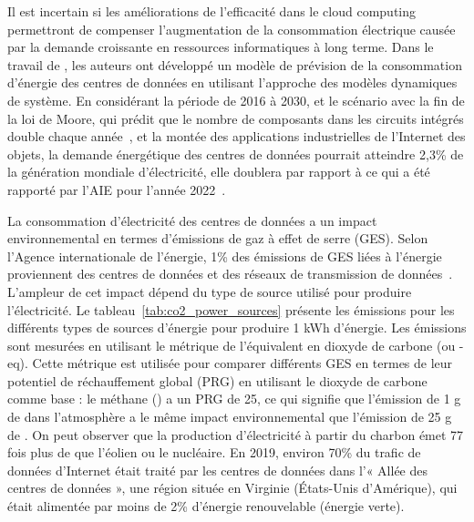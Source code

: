 Il est incertain si les améliorations de l'efficacité dans le cloud computing permettront de compenser l'augmentation de la consommation électrique causée par la demande croissante en ressources informatiques à long terme. Dans le travail de \citet{koot2021usage}, les auteurs ont développé un modèle de prévision de la consommation d'énergie des centres de données en utilisant l'approche des modèles dynamiques de système. En considérant la période de 2016 à 2030, et le scénario avec la fin de la loi de Moore, qui prédit que le nombre de composants dans les circuits intégrés double chaque année~\cite{Mack_2011_moorelaw}, et la montée des applications industrielles de l'Internet des objets, la demande énergétique des centres de données pourrait atteindre 2,3\% de la génération mondiale d'électricité, elle doublera par rapport à ce qui a été rapporté par l'AIE pour l'année 2022~\cite{IEA_2022}.


La consommation d'électricité des centres de données a un impact environnemental en termes d'émissions de gaz à effet de serre (GES). Selon l'Agence internationale de l'énergie, 1\% des émissions de GES liées à l'énergie proviennent des centres de données et des réseaux de transmission de données~\cite{IEA_2022}. L'ampleur de cet impact dépend du type de source utilisé pour produire l'électricité. Le tableau~\ref{tab:co2_power_sources} présente les émissions pour les différents types de sources d'énergie pour produire 1 kWh d'énergie. Les émissions sont mesurées en utilisant le métrique de l'équivalent en dioxyde de carbone (ou -eq). Cette métrique est utilisée pour comparer différents GES en termes de leur potentiel de réchauffement global (PRG) en utilisant le dioxyde de carbone comme base : le méthane () a un PRG de 25, ce qui signifie que l'émission de 1 g de  dans l'atmosphère a le même impact environnemental que l'émission de 25 g de \cite{eurostat_co2_eq}. On peut observer que la production d'électricité à partir du charbon émet 77 fois plus de  que l'éolien ou le nucléaire. En 2019, environ 70\% du trafic de données d'Internet était traité par les centres de données dans l'« Allée des centres de données », une région située en Virginie (États-Unis d'Amérique), qui était alimentée par moins de 2\% d'énergie renouvelable (énergie verte)\cite{clicking_clean_virginia}.


